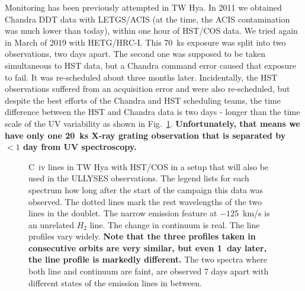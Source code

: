 \documentclass[letterpaper,11pt,twocolumn]{article}
\begin{document}
Monitoring has been previously attempted in TW Hya. In 2011 we obtained Chandra DDT
data with LETGS/ACIS (at the time, the ACIS contamination was much lower than
today), within one hour of HST/COS data.
We tried again in March of 2019 with HETG/HRC-I. This 70~ks exposure was split into two
observations, two days apart. The second one was supposed to be taken simultaneous to HST data,
but a Chandra command error caused that exposure to fail. It was
re-scheduled about three months later. Incidentally, the HST observations
suffered from an acquisition error and were also re-scheduled, but despite the
best efforts of the Chandra and HST scheduling teams, the time difference
between the HST and Chandra data is two days - longer than the time scale of the
UV variability as shown in Fig.~\ref{fig:UV2}. \textbf{Unfortunately, that
  means we have only one 20~ks X-ray grating observation that is separated by
  $<1$ day from UV spectroscopy.}

\begin{figure}
\begin{center}
\end{center}
\caption{\label{fig:UV2} C~{\sc iv} lines in TW Hya with HST/COS in a setup that will also be used in the ULLYSES observations. The legend lists for each spectrum how long after the
  start of the campaign this data was observed. The dotted lines mark the rest wavelengths of the two
  lines in the  doublet. The narrow emission feature at $-125$~km/s is
  an unrelated $H_2$ line. The change in continuum is real. The line profiles vary widely. \textbf{Note that the three
profiles taken in consecutive orbits are very similar, but even 1~day later,
the line profile is markedly different.} The two spectra where both line and
continuum are faint, are observed 7 days apart with different states of the
emission lines in between.}
\end{figure}
\end{document}
